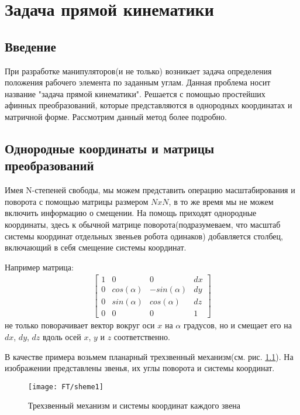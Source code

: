 \chapter{Задача прямой кинематики} \label{ch:3}

\section{Введение} \label{sect3_1}
При разработке манипуляторов(и не только) возникает задача определения положения рабочего элемента по заданным углам. Данная проблема носит название "задача прямой кинематики". Решается с помощью простейших афинных преобразований, которые представляются в однородных координатах и матричной форме. Рассмотрим данный метод более подробно.

\section{Однородные координаты и матрицы преобразований}
Имея N-степеней свободы, мы можем представить операцию масштабирования и поворота с помощью матрицы размером $NxN$, в то же время мы не можем включить информацию о смещении. На помощь приходят однородные координаты, здесь к обычной матрице поворота(подразумеваем, что масштаб системы координат отдельных звеньев робота одинаков) добавляется столбец, включающий в себя смещение системы координат.

Например матрица:
\begin{align*}
	\begin{bmatrix}
		1	&	0				&	0				&	dx\\
		0	&	cos(\alpha)		&	-sin(\alpha)	&	dy\\
		0	&	sin(\alpha)		&	cos(\alpha)		&	dz\\
		0	&	0				&	0				&	1
	\end{bmatrix}
\end{align*}
не только поворачивает вектор вокруг оси $x$ на $\alpha$ градусов, но и смещает его на $dx$, $dy$, $dz$ вдоль осей $x$, $y$ и $z$ соответственно.

В качестве примера возьмем планарный трехзвенный механизм(см. рис. \ref{fig:ft_sheme1}). На изображении представлены звенья, их углы поворота и системы координат.
\begin{figure}[ht]
	\centering
	\texttt{[image: FT/sheme1]}
	\caption{Трехзвенный механизм и системы координат каждого звена}
	\label{fig:ft_sheme1}
\end{figure}




